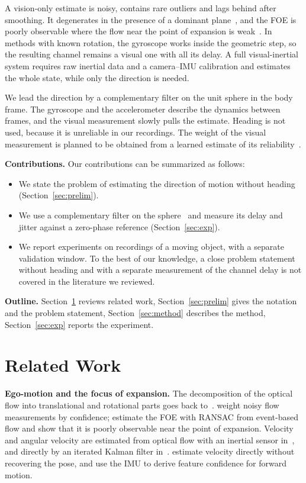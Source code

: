 \documentclass{article}
\begin{document}
A vision-only estimate is noisy, contains rare outliers and lags behind after smoothing. It degenerates in the presence of a dominant plane~\citep{chum2005dominant}, and the FOE is poorly observable where the flow near the point of expansion is weak~\citep{dinaux2021faith}. In methods with known rotation, the gyroscope works inside the geometric step, so the resulting channel remains a visual one with all its delay. A full visual-inertial system requires raw inertial data and a camera--IMU calibration and estimates the whole state, while only the direction is needed.

We lead the direction by a complementary filter on the unit sphere in the body frame. The gyroscope and the accelerometer describe the dynamics between frames, and the visual measurement slowly pulls the estimate. Heading is not used, because it is unreliable in our recordings. The weight of the visual measurement is planned to be obtained from a learned estimate of its reliability~\citep{yi2018learning, qiu2023airimu}.

\textbf{Contributions.} Our contributions can be summarized as follows:
\begin{itemize}
    \item We state the problem of estimating the direction of motion without heading (Section~\ref{sec:prelim}).
    \item We use a complementary filter on the sphere~\citep{mahony2008nonlinear, kurz2017libdirectional} and measure its delay and jitter against a zero-phase reference (Section~\ref{sec:exp}).
    \item We report experiments on recordings of a moving object, with a separate validation window. To the best of our knowledge, a close problem statement without heading and with a separate measurement of the channel delay is not covered in the literature we reviewed.
\end{itemize}

\textbf{Outline.} Section~\ref{sec:rw} reviews related work, Section~\ref{sec:prelim} gives the notation and the problem statement, Section~\ref{sec:method} describes the method, Section~\ref{sec:exp} reports the experiment.

\section{Related Work}\label{sec:rw}

\textbf{Ego-motion and the focus of expansion.} The decomposition of the optical flow into translational and rotational parts goes back to~\citet{longuet1980interpretation}. \citet{jaegle2016egomotion} weight noisy flow measurements by confidence; \citet{dinaux2021faith} estimate the FOE with RANSAC from event-based flow and show that it is poorly observable near the point of expansion. Velocity and angular velocity are estimated from optical flow with an inertial sensor in~\citep{grabe2015nonlinear}, and directly by an iterated Kalman filter in~\citep{zhong2020direct}. \citet{xu2024tight} estimate velocity directly without recovering the pose, and \citet{lee2017forward} use the IMU to derive feature confidence for forward motion.
\end{document}
